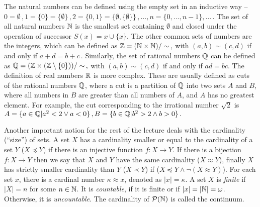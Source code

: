 The natural numbers can be defined using the empty set in an inductive way -- $0 = \emptyset\,,1=\{0\} = \{\emptyset\}\,, 2=\{0,1\} = \{\emptyset, \{\emptyset\}\}\,, \dots, n=\{0, \dots, n-1\}, \dots\,.$ The set of all natural numbers $\mathbb{N}$ is the smallest set containing $\emptyset$ and closed under the operation of successor $S(x) = x \cup \{x\}$. The other common sets of numbers are the integers, which can be defined as $\mathbb{Z} = (\mathbb{N} \times \mathbb{N})/\sim\,,$ with $(a,b) \sim (c,d)$ if and only if $a + d = b + c\,.$ Similarly, the set of rational numbers $\mathbb{Q}$ can be defined as $\mathbb{Q} = (\mathbb{Z} \times (\mathbb{Z} \setminus \{0\}))/\sim\,,$ with $(a,b) \sim (c,d)$ if and only if $ad=bc$. The definition of real numbers ${\mathbb{R}}$ is more complex. These are usually defined as cuts of the rational numbers $\mathbb{Q}$, where a cut is a partition of $\mathbb{Q}$ into two sets $A$ and $B$, where all numbers in $B$ are greater than all numbers of $A$, and $A$ has no greatest element. For example, the cut corresponding to the irrational number $\sqrt{2}$ is $A = \{a\in \mathbb{Q} | a^2 < 2 \lor a < 0\}\,, B = \{b\in \mathbb{Q} | b^2 > 2 \land b > 0\}\,.$

Another important notion for the rest of the lecture deals with the cardinality (``size'') of sets. A set $X$ has a cardinality smaller or equal to the cardinality of a set $Y$ ($X \preceq Y$) if there is an injective function $f: X \to Y$. If there is a bijection $f: X \to Y$ then we say that $X$ and $Y$ have the same cardinality ($X \approx Y$), finally $X$ has strictly smaller cardinality than $Y$ ($X \prec Y$) if ($X \preceq Y \land \neg(X \approx Y)$). For each set $x$, there is a cardinal number $\kappa \approx x$, denoted as $|x| = \kappa$. A set $X$ is \emph{finite} if $|X| = n$ for some $n \in \mathbb{N}$. It is \emph{countable}, if it is finite or if $|x| = |\mathbb{N}| = \omega$. Otherwise, it is \emph{uncountable}. The cardinality of $\mathcal{P}(\mathbb{N})$ is called the continuum.

